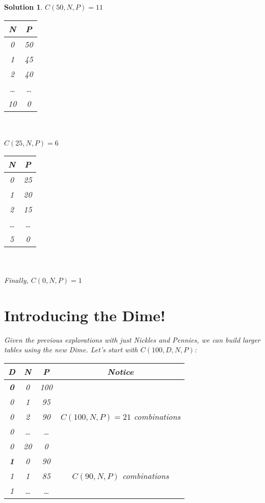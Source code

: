 \documentclass{article}
\newtheorem*{solution*}{Solution}
\begin{document}
\begin{solution*}
$C(50, N, P)=11$\\
\begin{tabular}{|c|c|}
    \hline
    N & P \\
    \hline
    0 & 50\\
    \hline
    1 & 45\\
    \hline
    2 & 40\\
    \hline
    \dots & \dots\\
    \hline
    10 & 0\\
    \hline
\end{tabular}\\\\  

$C(25, N, P)=6$\\
\begin{tabular}{|c|c|}
    \hline
    N & P \\
    \hline
    0 & 25\\
    \hline
    1 & 20\\
    \hline
    2 & 15\\
    \hline
    \dots & \dots\\
    \hline
    5 & 0\\
    \hline
\end{tabular}\\\\  

Finally, $C(0, N, P)=1$\\

\newpage
\section{Introducing the Dime!}
Given the previous explorations with just Nickles 
and Pennies, we can build larger tables using the new 
Dime. Let's start with $C(100, D, N, P)$:\\

\begin{tabular}{|c|c|c|c|}
    \toprule
    D & N & P & Notice\\
    \hline
    \textbf{0} & 0 & 100 & \multirow{5}{*}{{
        $C(100, N, P)=21$ combinations
    }} \\
    \cline{1-3}
    0 & 1 & 95 & \\
    \cline{1-3}
    0 & 2 & 90 & \\
    \cline{1-3}
    0 & \dots & \dots & \\
    \cline{1-3}
    0 & 20 & 0 & \\

    \bottomrule
    \textbf{1} & 0 & 90 & \multirow{3}{*}{{
        $C(90, N, P)$ combinations
    }} \\
    \cline{1-3}
    1 & 1 & 85 & \\
    \cline{1-3}
    1 & \dots & \dots & \\


\end{tabular}
\end{solution*}
\end{document}
